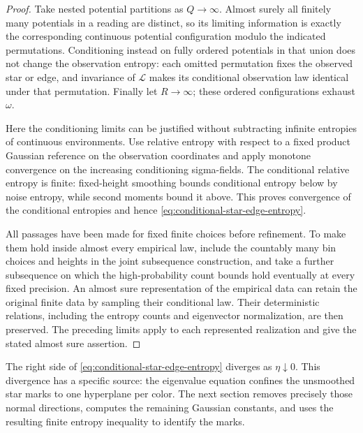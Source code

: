 \begin{proof}
Take nested potential partitions as \(Q\to\infty\).  Almost surely
all finitely many potentials in a reading are distinct, so its
limiting information is exactly the corresponding continuous
potential configuration modulo the indicated permutations.
Conditioning instead on fully ordered potentials in that union
does not change the observation entropy: each omitted permutation
fixes the observed star or edge, and invariance of \(\mathcal L\)
makes its conditional observation law identical under that
permutation.  Finally let \(R\to\infty\); these ordered
configurations exhaust \(\omega\).

Here the conditioning limits can be justified without subtracting
infinite entropies of continuous environments.  Use relative
entropy with respect to a fixed product Gaussian reference on
the observation coordinates and apply monotone convergence on
the increasing conditioning sigma-fields.  The conditional
relative entropy is finite: fixed-height smoothing bounds
conditional entropy below by noise entropy, while second moments
bound it above.  This proves convergence of the conditional
entropies and hence \eqref{eq:conditional-star-edge-entropy}.

All passages have been made for fixed finite choices before
refinement.  To make them hold inside almost every empirical law,
include the countably many bin choices and heights in the joint
subsequence construction, and take a further subsequence on which
the high-probability count bounds hold eventually at every fixed
precision.  An almost sure representation of the empirical data
can retain the original finite data by sampling their conditional
law.  Their deterministic relations, including the entropy
counts and eigenvector normalization, are then preserved.  The
preceding limits apply to each represented realization and give
the stated almost sure assertion.
\end{proof}

The right side of \eqref{eq:conditional-star-edge-entropy} diverges
as \(\eta\downarrow0\).  This divergence has a specific source: the
eigenvalue equation confines the unsmoothed star marks to one
hyperplane per color.  The next section removes precisely those
normal directions, computes the remaining Gaussian constants,
and uses the resulting finite entropy inequality to identify the
marks.
